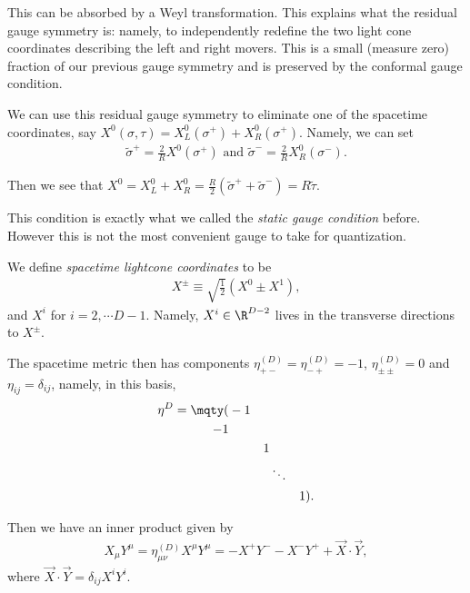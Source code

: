 This can be absorbed by a Weyl transformation. This explains what the residual gauge symmetry is: namely, to independently redefine the two light cone coordinates describing the left and right movers. This is a small (measure zero) fraction of our previous gauge symmetry and is preserved by the  conformal gauge condition.

We can use this residual gauge symmetry to eliminate one of the spacetime coordinates, say $X^{0}\left( \sigma, \tau \right) = X^{0}_L \left( \sigma^{+} \right) + X_R^{0}\left( \sigma^{+} \right) $. Namely, we can set
\begin{align}
    \widetilde{\sigma}^{+} = \frac{2}{R} X^{0}\left( \sigma^{+} \right)  \text{~and~} \widetilde{\sigma}^{-} = \frac{2}{R} X^{0}_R \left( \sigma^{-} \right) 
.\end{align}

Then we see that $X^{0} = X^{0}_L + X^{0}_R = \frac{R}{2} \left( \widetilde{\sigma}^{+} + \widetilde{\sigma}^{-} \right) = R \widetilde{\tau}$.

This condition is exactly what we called the \emph{static gauge condition} before. However this is not the most convenient gauge to take for quantization.


\begin{definition}
    We define \emph{spacetime lightcone coordinates} to be
    \begin{align}
        X^{\pm} \equiv \sqrt{\frac{1}{2}}  \left( X^{0} \pm X^{1} \right) 
    ,\end{align}
    and $X^{i}$ for $i = 2,\cdots D-1$. Namely, $X^{i} \in \R^{D-2}$ lives in the transverse directions to $X^{\pm}$.
\end{definition}

The spacetime metric then has components $\eta^{\left( D \right) }_{+-} = \eta^{\left( D \right) }_{-+} = - 1$, $\eta^{\left( D \right) }_{\pm \pm} = 0$ and $\eta_{ij} = \delta_{ij}$, namely, in this basis,
\begin{align}
    \eta^{D} = \mqty( & -1 &  & & \\ -1 & & & & \\ & & 1 & & \\ & & & \ddots & \\ & & & & 1)
.\end{align}

Then we have an inner product given by
\begin{align}
    X_\mu Y^{\mu} = \eta_{\mu \nu}^{\left( D \right) } X^{\mu} Y^{\mu} = - X^{+} Y^{-} - X^{-} Y^{+} + \vec{X} \cdot \vec{Y}
,\end{align}
where $\vec{X} \cdot \vec{Y} = \delta_{ij} X^{i} Y^{i}$.

